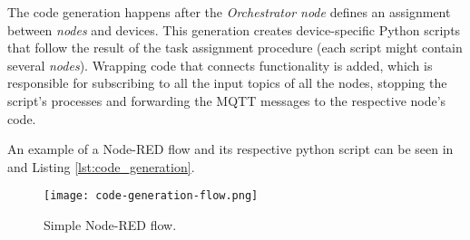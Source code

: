 The code generation happens after the \textit{Orchestrator node} defines an assignment between \textit{nodes} and devices. This generation creates device-specific Python scripts that follow the result of the task assignment procedure (each script might contain several \textit{nodes}). Wrapping code that connects functionality is added, which is responsible for subscribing to all the input topics of all the nodes, stopping the script's processes and forwarding the MQTT messages to the respective node's code.

An example of a Node-RED flow and its respective python script can be seen in  and Listing \ref{lst:code_generation}.

\begin{figure}[h]
    \centering
    \texttt{[image: code-generation-flow.png]}
    \caption{Simple Node-RED flow.}
    \label{fig:code_generation_flow}
\end{figure}

